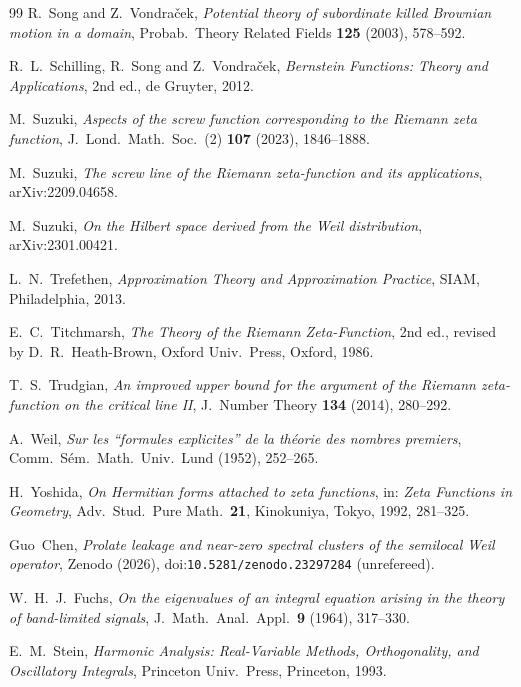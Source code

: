 \documentclass[11pt]{amsart}
\theoremstyle{definition}
\theoremstyle{remark}
\begin{document}
\begin{thebibliography}{99}
 R.~Song and Z.~Vondra\v{c}ek, \emph{Potential theory of subordinate
killed Brownian motion in a domain}, Probab.~Theory Related Fields \textbf{125} (2003), 578--592.

 R.~L.~Schilling, R.~Song and Z.~Vondra\v{c}ek, \emph{Bernstein Functions:
Theory and Applications}, 2nd ed., de Gruyter, 2012.

 M.~Suzuki, \emph{Aspects of the screw function corresponding to the
Riemann zeta function}, J.~Lond.~Math.~Soc.~(2) \textbf{107} (2023), 1846--1888.

 M.~Suzuki, \emph{The screw line of the Riemann zeta-function and
its applications}, arXiv:2209.04658.

 M.~Suzuki, \emph{On the Hilbert space derived from the Weil
distribution}, arXiv:2301.00421.

 L.~N.~Trefethen, \emph{Approximation Theory and Approximation Practice},
SIAM, Philadelphia, 2013.

 E.~C.~Titchmarsh, \emph{The Theory of the Riemann Zeta-Function}, 2nd ed., revised by D.~R.~Heath-Brown,
Oxford Univ.\ Press, Oxford, 1986.

 T.~S.~Trudgian, \emph{An improved upper bound for the argument of the Riemann zeta-function on the critical line II}, J.~Number Theory \textbf{134} (2014), 280--292.

 A.~Weil, \emph{Sur les ``formules explicites'' de la th\'eorie des nombres
premiers}, Comm.~S\'em.~Math.~Univ.~Lund (1952), 252--265.

 H.~Yoshida, \emph{On Hermitian forms attached to zeta functions}, in:
\emph{Zeta Functions in Geometry}, Adv.~Stud.~Pure Math.~\textbf{21}, Kinokuniya, Tokyo, 1992, 281--325.

 Guo~Chen, \emph{Prolate leakage and near-zero spectral clusters of the semilocal Weil operator},
Zenodo (2026), doi:\nolinkurl{10.5281/zenodo.23297284} (unrefereed).

 W.~H.~J.~Fuchs, \emph{On the eigenvalues of an integral equation arising in the theory of band-limited
signals}, J.\ Math.\ Anal.\ Appl.\ \textbf{9} (1964), 317--330.

 E.~M.~Stein, \emph{Harmonic Analysis: Real-Variable Methods, Orthogonality, and Oscillatory Integrals},
Princeton Univ.~Press, Princeton, 1993.


\end{thebibliography}
\end{document}
